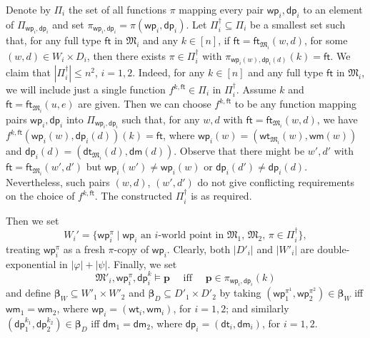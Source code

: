 \documentclass[10pt,a4paper]{amsart}
\theoremstyle{plain}
\theoremstyle{definition}
\newcommand{\wt}{\mathsf{wt}}
\newcommand{\dt}{\mathsf{dt}}
\newcommand{\ft}{\mathsf{ft}}
\newcommand{\wm}{\mathsf{wm}}
\newcommand{\dm}{\mathsf{dm}}
\newcommand{\iwp}{\mathsf{wp}_i}
\newcommand{\idp}{\mathsf{dp}_i}
\newcommand{\owp}{\mathsf{wp}_1}
\newcommand{\twp}{\mathsf{wp}_2}
\newcommand{\odp}{\mathsf{dp}_1}
\newcommand{\tdp}{\mathsf{dp}_2}
\newcommand{\bs}{\boldsymbol{\beta}}
\newcommand{\fform}[1]{\boldsymbol{#1}}
\newcommand{\pvar}{\fform{p}}
\begin{document}
Denote by $\Pi_{i}$ the set of all functions $\pi$ mapping every pair $\iwp,\idp$ to an element of $\Pi_{\iwp,\idp}$ and set $\pi_{\iwp,\idp}=\pi(\iwp,\idp)$.  
Let $\Pi_{i}^{\dag}\subseteq \Pi_{i}$ be a smallest set such that, for any full type $\ft$ in $\mathfrak M_i$ and any $k\in [n]$, if 
$\ft=\ft_{\mathfrak M_i}(w,d)$, for some $(w,d)\in W_i\times D_i$, then there exists $\pi\in \Pi_{i}^{\dag}$ with 
$\pi_{\iwp(w),\idp(d)}(k) = \ft$. 
%
We claim that $|\Pi^{\dag}_i|\leq n^{2}$, $i=1,2$. Indeed, for any $k\in [n]$ and any full type $\ft$ in $\mathfrak{M}_i$,  
we will include just a single function $f^{k,\ft}\in \Pi_i$ in $\Pi^\dag_i$.
Assume $k$ and $\ft=\ft_{\mathfrak{M}_i}(u,e)$ are given. Then we can choose $f^{k,\ft}$ to be any function mapping pairs $\iwp,\idp$ into $\Pi_{\iwp,\idp}$ such that, for any $w,d$ with $\ft=\ft_{\mathfrak{M}_{i}}(w,d)$,  we have  $f^{k,\ft}(\iwp(w),\idp(d))(k)=\ft$, where $\iwp(w)=(\wt_{\mathfrak{M}_{i}}(w),\wm(w))$ and
$\idp(d)=(\dt_{\mathfrak{M}_{i}}(d),\dm(d))$.
 Observe that there might be $w',d'$ with $\ft=\ft_{\mathfrak{M}_{i}}(w',d')$ but $\iwp(w')\not=\iwp(w)$
or $\idp(d')\not=\idp(d)$. Nevertheless, such pairs $(w,d)$, $(w',d')$ do not give conflicting requirements on the choice of $f^{k,\ft}$.
The constructed $\Pi^{\dag}_i$ is as required.

	
Then we set
%
\begin{equation*}
W_{i}' = \{ \iwp^\pi \mid \iwp \text{ an $i$-world point in $\mathfrak{M}_{1}$, $\mathfrak{M}_{2}$, $\pi \in \Pi_{i}^{\dag}$}\}, 
\end{equation*}
%
treating $\iwp^\pi$ as a fresh $\pi$-copy of $\iwp$. Clearly, both $|D'_i|$ and $|W'_i|$ are double-exponential in $|\varphi|+|\psi|$. 
%
Finally, we set 
%
\begin{equation}\label{models}
\mathfrak M'_i, \iwp^\pi, \idp^k \models \pvar \quad \text{ iff } \quad \pvar \in \pi_{\iwp,\idp}(k)
\end{equation}
%
and define $\bs_W \subseteq W'_1 \times W'_2$ and $\bs_D \subseteq D'_1 \times D'_2$ by taking 
%
$(\owp^{\pi^1}, \twp^{\pi^2})\in\bs_W$ iff $\wm_1 = \wm_2$, where $\iwp = (\wt_i, \wm_i)$, for $i=1,2$; and similarly   
%
$(\odp^{k_1}, \tdp^{k_2})\in\bs_D$ iff $\dm_1 = \dm_2$, where $\idp = (\dt_i, \dm_i)$, for $i=1,2$.
\end{document}
